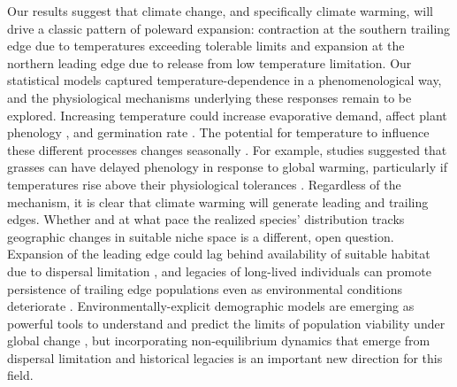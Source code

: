 \documentclass[9pt,twocolumn,twoside,lineno]{pnas-new}
\newcommand{\revise}[1]{{\color{Mahogany}{#1}}}
\begin{document}
Our results suggest that climate change, and specifically climate warming, will drive a classic pattern of poleward expansion: contraction at the southern trailing edge due to temperatures exceeding tolerable limits and expansion at the northern leading edge due to release from low temperature limitation. 
Our statistical models captured temperature-dependence in a phenomenological way, and the physiological mechanisms underlying these responses remain to be explored. 
Increasing temperature could increase evaporative demand, affect plant phenology \citep{mclean2016predicting,iler2019reproductive}, and germination rate \citep{reed2021climate}.
The potential for temperature to influence these different processes changes seasonally \citep{konapala2020climate}.
For example, studies suggested that grasses can have delayed phenology in response to global warming, particularly if temperatures rise above their physiological tolerances \citep{cleland2006diverse}.
Regardless of the mechanism, it is clear that climate warming will generate leading and trailing edges. 
Whether and at what pace the realized species' distribution tracks geographic changes in suitable niche space is a different, open question. 
Expansion of the leading edge could lag behind availability of suitable habitat due to dispersal limitation \citep{pagel2020mismatches}, and legacies of long-lived individuals can promote persistence of trailing edge populations even as environmental conditions deteriorate \revise{\citep{margaret2023trailing,bohner2020extensive}}.
Environmentally-explicit demographic models are emerging as powerful tools to understand and predict the limits of population viability under global change \citep{schultz2022climate, merow2017climate}, but incorporating non-equilibrium dynamics that emerge from dispersal limitation and historical legacies is an important new direction for this field.
\end{document}
